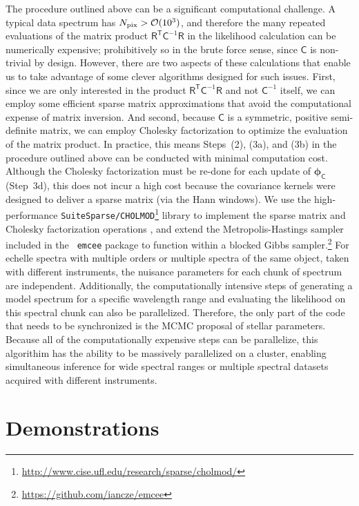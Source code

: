\documentclass[iop,floatfix,twocolappendix]{emulateapj}
\newcommand{\vR}{\mathsf{R}}
\newcommand{\vC}{\mathsf{C}}
\newcommand{\trans}{\mathsf{T}}
\newcommand{\vp}{ {\bm \phi}}
\begin{document}
The procedure outlined above can be a significant computational challenge.  A typical data spectrum 
has $N_{\rm pix} > \mathcal{O}(10^3)$, and therefore the many repeated evaluations of the matrix 
product $\vR^{\trans} \vC^{-1} \vR$ in the likelihood calculation can be numerically expensive; 
prohibitively so in the brute force sense, since $\vC$ is non-trivial by design.  However, there 
are two aspects of these calculations that enable us to take advantage of some clever algorithms 
designed for such issues.  First, since we are only interested in the product $\vR^{\trans} 
\vC^{-1} \vR$ and not $\vC^{-1}$ itself, we can employ some efficient sparse matrix approximations 
that avoid the computational expense of matrix inversion.  And second, because $\vC$ is a 
symmetric, positive semi-definite matrix, we can employ Cholesky factorization to optimize the 
evaluation of the matrix product.  In practice, this means Steps~(2), (3a), and (3b) in the 
procedure outlined above can be conducted with minimal computation cost.  Although the Cholesky 
factorization must be re-done for each update of $\vp_{\mathsf C}$ (Step~3d), this does not incur a 
high cost because the covariance kernels were designed to deliver a sparse matrix (via the Hann 
windows).  We use the high-performance \texttt{SuiteSparse/CHOLMOD}\footnote{\url{http://www.cise.ufl.edu/research/sparse/cholmod/}} library to implement the sparse matrix and Cholesky factorization 
operations \citep{chen08,davis09}, and extend the Metropolis-Hastings sampler included in the {\tt 
emcee} package \citep{foreman-mackey13} to function within a blocked Gibbs 
sampler.\footnote{\url{https://github.com/iancze/emcee}} For echelle spectra with multiple orders or multiple spectra of the same object, taken with different instruments, the nuisance parameters for each chunk of spectrum are independent. Additionally, the computationally intensive steps of generating a model spectrum for a specific wavelength range and evaluating the likelihood on this spectral chunk can also be parallelized. Therefore, the only part of the code that needs to be synchronized is the MCMC proposal of stellar parameters. Because all of the computationally expensive steps can be parallelize, this algorithim has the ability to be massively parallelized on a cluster, enabling simultaneous inference for wide spectral ranges or multiple spectral datasets acquired with different instruments.\\



\section{Demonstrations} \label{sec:examples}
\end{document}
